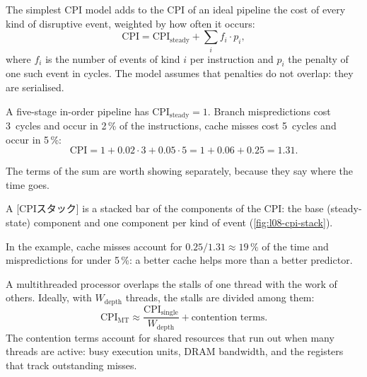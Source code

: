 \documentclass[../main.tex]{subfiles}
\begin{document}
The simplest CPI model adds to the CPI of an ideal pipeline the cost of
every kind of disruptive event, weighted by how often it occurs:
\begin{equation}
  \mathrm{CPI} = \mathrm{CPI}_{\text{steady}} +
    \sum_{i} f_i \cdot p_i ,
  \label{eq:l08-cpi}
\end{equation}
where $f_i$ is the number of events of kind $i$ per instruction and
$p_i$ the penalty of one such event in cycles.  The model assumes that
penalties do not overlap: they are serialised.

\begin{example}
  \label{ex:l08-cpi}
  A five-stage in-order pipeline has $\mathrm{CPI}_{\text{steady}} = 1$.
  Branch mispredictions cost \num{3}~cycles and occur in 2\,\% of the
  instructions, cache misses cost \num{5}~cycles and occur in 5\,\%:
  \[
    \mathrm{CPI} = 1 + 0.02 \cdot 3 + 0.05 \cdot 5 = 1 + 0.06 + 0.25
    = 1.31 .
  \]
\end{example}

\begin{marginfigure}
  \resizebox{\linewidth}{!}{}
  \caption{CPI stack of \cref{ex:l08-cpi}.}
  \label{fig:l08-cpi-stack}
\end{marginfigure}

The terms of the sum are worth showing separately, because they say
where the time goes.

\begin{definition}
  \label{def:l08-cpi-stack}
  A [CPIスタック] is a stacked bar of the components of
  the CPI: the base (steady-state) component and one component per
  kind of event (\cref{fig:l08-cpi-stack}).
\end{definition}

In the example, cache misses account for $0.25/1.31 \approx 19\,\%$ of
the time and mispredictions for under 5\,\%: a better cache helps more
than a better predictor.

A multithreaded processor overlaps the stalls of one thread with the
work of others.  Ideally, with $W_{\text{depth}}$ threads, the stalls
are divided among them:
\begin{equation}
  \mathrm{CPI}_{\text{MT}} \approx
    \frac{\mathrm{CPI}_{\text{single}}}{W_{\text{depth}}}
    + \text{contention terms}.
  \label{eq:l08-cpi-mt}
\end{equation}
The contention terms account for shared resources that run out when
many threads are active: busy execution units, DRAM bandwidth, and the
registers that track outstanding misses.
\end{document}
